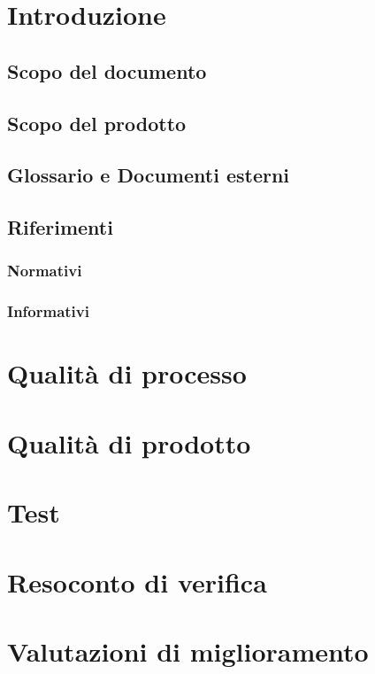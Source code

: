 \documentclass[]{article}
\begin{document}
	
	\newpage


	\section{Introduzione}
	
	\subsection{Scopo del documento}
	
	
	\subsection{Scopo del prodotto}
	
	\subsection{Glossario e Documenti esterni}
	
	\subsection{Riferimenti}
	
	\subsubsection{Normativi}
	
	\subsubsection{Informativi}
	
	
	\newpage

	\section{Qualità di processo}
	
	\newpage

	\section{Qualità di prodotto}
	
	\newpage

	\section{Test}
	
	\newpage
	
	\section{Resoconto di verifica}
	
	\newpage
	
	\section{Valutazioni di miglioramento}
	
	\newpage
\end{document}
